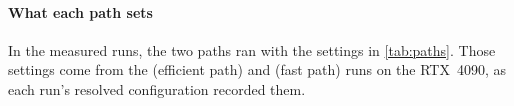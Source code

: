 \paragraph{What each path sets}
In the measured runs, the two paths ran with the settings in \cref{tab:paths}.
Those settings come from the  (efficient path) and  (fast path) runs on the RTX~4090, as each run's resolved configuration recorded them.


